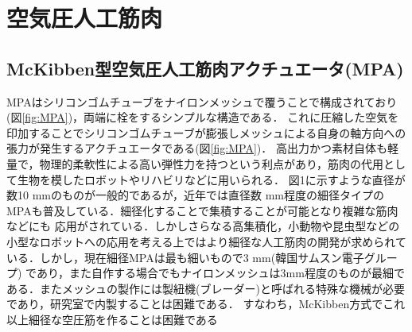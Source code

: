 \newpage
\section{空気圧人工筋肉}
\subsection{McKibben型空気圧人工筋肉アクチュエータ(MPA)}
MPAはシリコンゴムチューブをナイロンメッシュで覆うことで構成されており(図\ref{fig:MPA})，両端に栓をするシンプルな構造である．
これに圧縮した空気を印加することでシリコンゴムチューブが膨張しメッシュによる自身の軸方向への張力が発生するアクチュエータである\cite{Yu22}(図\ref{fig:MPA})．
高出力かつ素材自体も軽量で，物理的柔軟性による高い弾性力を持つという利点があり，筋肉の代用として生物を模したロボットやリハビリなどに用いられる．
図1に示すような直径が数10 mmのものが一般的であるが，近年では直径数 mm程度の細径タイプのMPAも普及している\cite{7989580}．細径化することで集積することが可能となり複雑な筋肉などにも
応用がされている．しかしさらなる高集積化，小動物や昆虫型などの小型なロボットへの応用を考える上ではより細径な人工筋肉の開発が求められている．しかし，現在細径MPAは最も細いもので3 mm(韓国サムスン電子グループ)
であり，また自作する場合でもナイロンメッシュは3mm程度のものが最細である．またメッシュの製作には製紐機(ブレーダー)と呼ばれる特殊な機械が必要であり，研究室で内製することは困難である．
すなわち，McKibben方式でこれ以上細径な空圧筋を作ることは困難である
